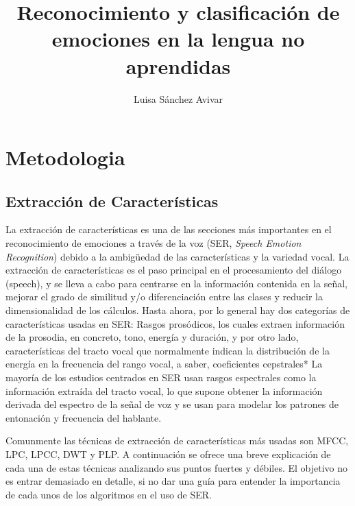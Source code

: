 \documentclass[11pt,a4paper,spanish]{book}
\begin{document}
	\title{Reconocimiento y clasificación de emociones en la lengua no aprendidas}
	\author{Luisa Sánchez Avivar}
	
	
	
	\chapter{Metodologia}
	\section{Extracción de Características}
	La extracción de características es una de las secciones más importantes en el reconocimiento de emociones a través de la voz (SER, \emph{Speech Emotion Recognition}) debido a la ambigüedad de las características y la variedad vocal. La extracción de características es el paso principal en el procesamiento del diálogo (speech), y se lleva a cabo para centrarse en la información contenida en la señal, mejorar el grado de similitud y/o diferenciación entre las clases y reducir la dimensionalidad de los cálculos.\cite{Hellbernd2016} Hasta ahora, por lo general hay dos categorías de características usadas en SER:
	Rasgos prosódicos, los cuales extraen información de la prosodia, en concreto, tono, energía y duración, y por otro lado, características del tracto vocal que normalmente indican la distribución de la energía en la frecuencia del rango vocal, a saber, coeficientes cepstrales*
	La mayoría de los estudios centrados en SER usan rasgos espectrales como la información extraída del tracto vocal, lo que supone obtener la información derivada del espectro de la señal de voz y se usan para modelar los patrones de entonación y frecuencia del hablante.\cite{Langari2020}
	
	
	
	Comunmente las técnicas de extracción de características más usadas son 
	MFCC, LPC, LPCC, DWT y PLP. A continuación se ofrece una breve explicación de cada una de estas técnicas analizando sus puntos fuertes y débiles.\cite{Rashid2018} El objetivo no es entrar demasiado en detalle, si no dar una guía para entender la importancia de cada unos de los algoritmos en el uso de SER.
	
\end{document}
